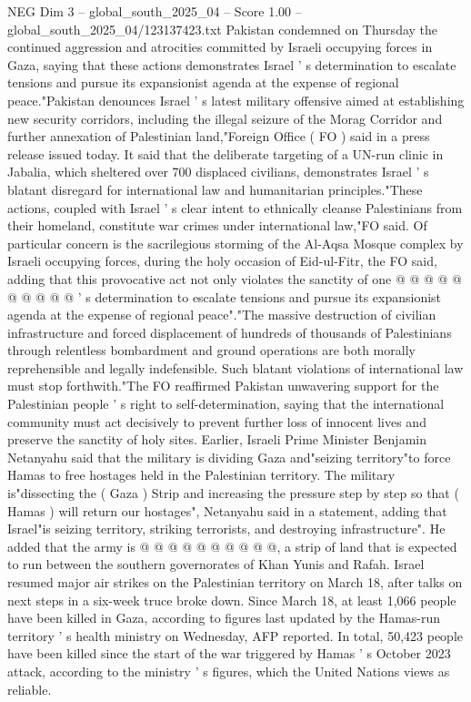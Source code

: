 \begin{textsample}{NEG Dim 3 – global\_south\_2025\_04 – Score 1.00 – global\_south\_2025\_04/123137423.txt}  \label{ex:f3_neg_344}
Pakistan condemned on Thursday the continued aggression and atrocities committed by Israeli occupying forces in Gaza, saying that these actions demonstrates Israel ' s determination to escalate tensions and pursue its expansionist agenda at the expense of regional peace."Pakistan denounces Israel ' s latest military offensive aimed at establishing new security corridors, including the illegal seizure of the Morag Corridor and further annexation of Palestinian land,"Foreign Office ( FO ) said in a press release issued today.
It said that the deliberate targeting of a UN-run clinic in Jabalia, which sheltered over 700 displaced civilians, demonstrates Israel ' s blatant disregard for international law and humanitarian principles."These actions, coupled with Israel ' s clear intent to ethnically cleanse Palestinians from their homeland, constitute war crimes under international law,"FO said.
Of particular concern is the sacrilegious storming of the Al-Aqsa Mosque complex by Israeli occupying forces, during the holy occasion of Eid-ul-Fitr, the FO said, adding that this provocative act not only violates the sanctity of one @ @ @ @ @ @ @ @ @ @ ' s determination to escalate tensions and pursue its expansionist agenda at the expense of regional peace"."The massive destruction of civilian infrastructure and forced displacement of hundreds of thousands of Palestinians through relentless bombardment and ground operations are both morally reprehensible and legally indefensible.
Such blatant violations of international law must stop forthwith."The FO reaffirmed Pakistan unwavering support for the Palestinian people ' s right to self-determination, saying that the international community must act decisively to prevent further loss of innocent lives and preserve the sanctity of holy sites.
Earlier, Israeli Prime Minister Benjamin Netanyahu said that the military is dividing Gaza and"seizing territory"to force Hamas to free hostages held in the Palestinian territory.
The military is"dissecting the ( Gaza ) Strip and increasing the pressure step by step so that ( Hamas ) will return our hostages", Netanyahu said in a statement, adding that Israel"is seizing territory, striking terrorists, and destroying infrastructure".
He added that the army is @ @ @ @ @ @ @ @ @ @, a strip of land that is expected to run between the southern governorates of Khan Yunis and Rafah.
Israel resumed major air strikes on the Palestinian territory on March 18, after talks on next steps in a six-week truce broke down.
Since March 18, at least 1,066 people have been killed in Gaza, according to figures last updated by the Hamas-run territory ' s health ministry on Wednesday, AFP reported.
In total, 50,423 people have been killed since the start of the war triggered by Hamas ' s October 2023 attack, according to the ministry ' s figures, which the United Nations views as reliable.

\end{textsample}
